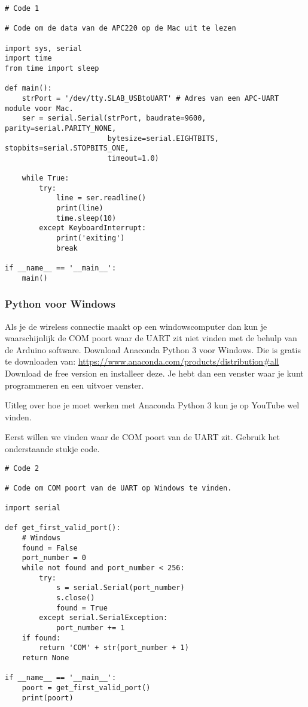 \begin{verbatim}
# Code 1

# Code om de data van de APC220 op de Mac uit te lezen

import sys, serial
import time
from time import sleep

def main():
    strPort = '/dev/tty.SLAB_USBtoUART' # Adres van een APC-UART module voor Mac.
    ser = serial.Serial(strPort, baudrate=9600, parity=serial.PARITY_NONE,
                        bytesize=serial.EIGHTBITS, stopbits=serial.STOPBITS_ONE,
                        timeout=1.0)

    while True:
        try:
            line = ser.readline()
            print(line)
            time.sleep(10)
        except KeyboardInterrupt:
            print('exiting')
            break

if __name__ == '__main__':
    main()
\end{verbatim}


\subsubsection{Python voor Windows}

Als je de wireless connectie maakt op een windowscomputer dan kun je
waarschijnlijk de COM poort waar de UART zit niet vinden met de behulp van de
Arduino software. Download Anaconda Python 3 voor Windows.
Die is gratis te downloaden van: \url{https://www.anaconda.com/products/distribution#all}
Download de free version en installeer deze. Je hebt dan een venster waar je kunt
programmeren en een uitvoer venster.

Uitleg over hoe je moet werken met Anaconda Python 3 kun je op YouTube wel vinden.

Eerst willen we vinden waar de COM poort van de UART zit. Gebruik het onderstaande
stukje code.

\begin{verbatim}
# Code 2

# Code om COM poort van de UART op Windows te vinden.

import serial

def get_first_valid_port():
    # Windows
    found = False
    port_number = 0
    while not found and port_number < 256:
        try:
            s = serial.Serial(port_number)
            s.close()
            found = True
        except serial.SerialException:
            port_number += 1
    if found:
        return 'COM' + str(port_number + 1)
    return None

if __name__ == '__main__':
    poort = get_first_valid_port()
    print(poort)
\end{verbatim}

